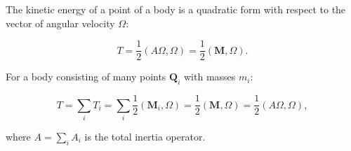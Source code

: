 The kinetic energy of a point of a body is a quadratic form with respect to the vector of angular velocity $\Omega$:

$$T = \frac{1}{2}(A\Omega, \Omega) = \frac{1}{2}(\mathbf{M}, \Omega).$$

For a body consisting of many points $\mathbf{Q}_i$ with masses $m_i$:

$$T = \sum_i T_i = \sum_i \frac{1}{2}(\mathbf{M}_i, \Omega) = \frac{1}{2}(\mathbf{M}, \Omega) = \frac{1}{2}(A\Omega, \Omega),$$

where $A = \sum_i A_i$ is the total inertia operator.
